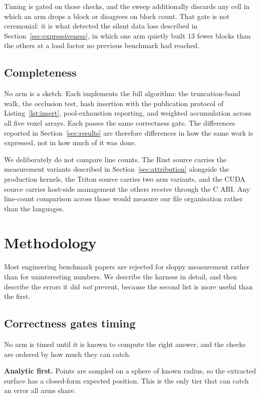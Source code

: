 \documentclass[11pt]{article}
\begin{document}
Timing is gated on those checks, and the sweep additionally discards any cell in
which an arm drops a block or disagrees on block count. That gate is not
ceremonial: it is what detected the silent data loss described in
Section~\ref{sec:expressiveness}, in which one arm quietly built 13 fewer blocks
than the others at a load factor no previous benchmark had reached.

\subsection{Completeness}

No arm is a sketch. Each implements the full algorithm: the truncation-band walk,
the occlusion test, hash insertion with the publication protocol of
Listing~\ref{lst:insert}, pool-exhaustion reporting, and weighted accumulation
across all five voxel arrays. Each passes the same correctness gate. The
differences reported in Section~\ref{sec:results} are therefore differences in
how the same work is expressed, not in how much of it was done.

We deliberately do not compare line counts. The Rust source carries the
measurement variants described in Section~\ref{sec:attribution} alongside the
production kernels, the Triton source carries two arm variants, and the CUDA
source carries host-side management the others receive through the C ABI. Any
line-count comparison across those would measure our file organisation rather
than the languages.

\section{Methodology}
\label{sec:method}

Most engineering benchmark papers are rejected for sloppy measurement rather
than for uninteresting numbers. We describe the harness in detail, and then
describe the errors it did \emph{not} prevent, because the second list is more
useful than the first.

\subsection{Correctness gates timing}

No arm is timed until it is known to compute the right answer, and the checks
are ordered by how much they can catch.

\textbf{Analytic first.} Points are sampled on a sphere of known radius, so the
extracted surface has a closed-form expected position. This is the only tier
that can catch an error all arms share.
\end{document}
